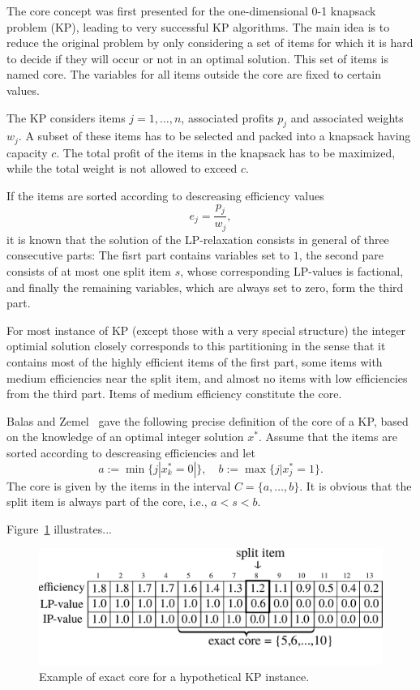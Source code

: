 The core concept was first presented for the one-dimensional 0-1 knapsack problem (KP),
leading to very successful KP algorithms.
The main idea is to reduce the original problem by only considering a set of
items for which it is hard to decide if they will occur or not in an optimal solution.
This set of items is named core.
The variables for all items outside the core are fixed to certain values.

The KP considers items $j = 1, \ldots, n$, associated profits $p_j$ and
associated weights $w_j$.
A subset of these items has to be selected and packed into a knapsack having capacity $c$.
The total profit of the items in the knapsack has to be maximized, while the
total weight is not allowed to exceed $c$.

If the items are sorted according to descreasing efficiency values
\begin{displaymath}
  e_j = \frac{p_j}{w_j},
\end{displaymath}
it is known that the solution of the LP-relaxation consists in general of
three consecutive parts: The fisrt part contains variables set to $1$, the second
pare consists of at most one split item $s$, whose corresponding LP-values is
factional, and finally the remaining variables, which are always set to zero,
form the third part.

For most instance of KP (except those with a very special structure) the integer
optimial solution closely corresponds to this partitioning in the sense that it
contains most of the highly efficient items of the first part, some items with
medium efficiencies near the split item, and almost no items with low efficiencies
from the third part.
Items of medium efficiency constitute the core.

Balas and Zemel~\cite{balas1980algorithm} gave the following precise definition
of the core of a KP, based on the knowledge of an optimal integer solution $x^*$.
Assume that the items are sorted according to descreasing efficiencies and let
\begin{displaymath}
  a := \min\{ j | x_k^* = 0 |\}, \quad b := \max\{ j | x_j^* = 1 \}.
\end{displaymath}
The core is given by the items in the interval $C = \{a, \ldots, b\}$.
It is obvious that the split item is always part of the core, i.e., $a < s < b$.

Figure~\ref{fig:kpecore} illustrates...

\begin{figure}[h]
  \centering
  \includegraphics[scale=0.406]{imgs/core}
  \caption{Example of exact core for a hypothetical KP instance.}
  \label{fig:kpecore}
\end{figure}

